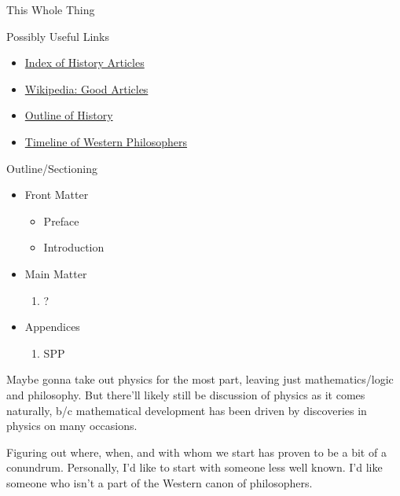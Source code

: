 \documentclass[./thoughthist.tex]{subfiles}
\begin{document}
\unnumpart{\bookfulltitle}

\begin{somenotes}{This Whole Thing}
    \item Possibly Useful Links
    \begin{itemize}
        \item \href{https://www.wikiwand.com/en/Index_of_history_articles}{Index of History Articles}
        \item \href{https://en.wikipedia.org/wiki/Wikipedia:Good_articles}{Wikipedia: Good Articles}
        \item \href{https://www.wikiwand.com/en/Outline_of_history}{Outline of History}
        \item \href{https://www.wikiwand.com/en/Timeline_of_Western_philosophers}{Timeline of Western Philosophers}
    \end{itemize}
    \item Outline\slash Sectioning
    \begin{itemize}
        \item Front Matter
        \begin{itemize}
            \item Preface
            \item Introduction
        \end{itemize}
        \item Main Matter
        \begin{enumerate}
            \item ?
        \end{enumerate}
        \item Appendices
        \begin{enumerate}[label=\Alph*)]
            \item SPP
        \end{enumerate}
    \end{itemize}
    \item Maybe gonna take out physics for the most part, leaving just mathematics\slash logic and philosophy. But there'll likely still be discussion of physics as it comes naturally, b\slash c mathematical development has been driven by discoveries in physics on many occasions.
    \item Figuring out where, when, and with whom we start has proven to be a bit of a conundrum. Personally, I'd like to start with someone less well known. I'd like someone who isn't a part of the Western canon of philosophers.
\end{somenotes}
\end{document}
